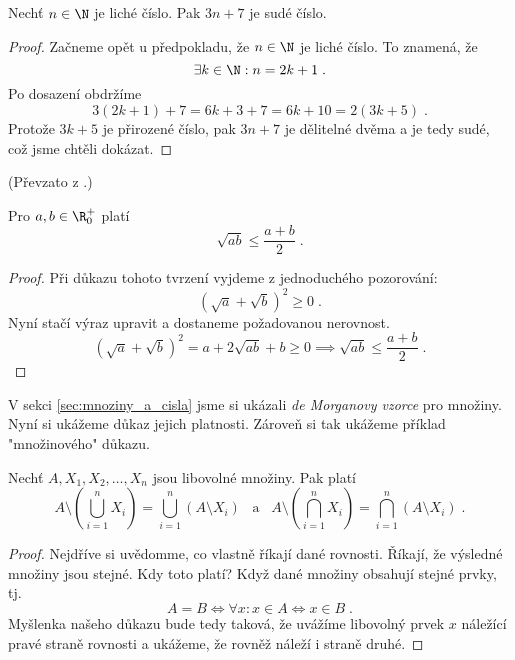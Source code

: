\begin{assertion}
    Nechť $n\in\N$ je liché číslo. Pak $3n+7$ je sudé číslo.
\end{assertion}
\begin{proof}
    Začneme opět u předpokladu, že $n\in\N$ je liché číslo. To znamená, že
    \begin{equation*}
        \exists k\in\N : n=2k+1\; .
    \end{equation*}
    Po dosazení obdržíme
    \begin{equation*}
        3(2k+1)+7=6k+3+7=6k+10=2(3k+5)\; .
    \end{equation*}
    Protože $3k+5$ je přirozené číslo, pak $3n+7$ je dělitelné dvěma a je tedy sudé, což jsme chtěli dokázat.
\end{proof}
(Převzato z \cite{ChartrandPolimeniZhang2014}.)
\begin{assertion}[AG nerovnost]
    Pro $a,b\in\R_0^+$ platí
    \begin{equation*}
        \sqrt{ab}\leq\dfrac{a+b}{2}\; .
    \end{equation*}
\end{assertion}
\begin{proof}
    Při důkazu tohoto tvrzení vyjdeme z jednoduchého pozorování:
    \begin{equation*}
        (\sqrt{a}+\sqrt{b})^2\geq 0\; .
    \end{equation*}
    Nyní stačí výraz upravit a dostaneme požadovanou nerovnost.
    \begin{equation*}
        (\sqrt{a}+\sqrt{b})^2 = a+2\sqrt{ab}+b\geq 0 \implies \sqrt{ab}\leq \dfrac{a+b}{2}\; .
    \end{equation*}
\end{proof}
V sekci \ref{sec:mnoziny_a_cisla} jsme si ukázali \emph{de Morganovy vzorce} pro množiny. Nyní si ukážeme důkaz jejich platnosti. Zároveň si tak ukážeme příklad "množinového" důkazu.
\begin{assertion}
    Nechť $A,X_1,X_2,\ldots,X_n$ jsou libovolné množiny. Pak platí
    \begin{equation*}
        A \setminus \left(\bigcup\limits_{i=1}^{n}{X_i}\right)=\bigcup\limits_{i=1}^{n}{(A \setminus X_i)}\;\;\;\text{a}\;\;\;A \setminus \left(\bigcap\limits_{i=1}^{n}{X_i}\right)=\bigcap\limits_{i=1}^{n}{(A \setminus X_i)}\; .
    \end{equation*}
\end{assertion}
\begin{proof}
    Nejdříve si uvědomme, co vlastně říkají dané rovnosti. Říkají, že výsledné množiny jsou stejné. Kdy toto platí? Když dané množiny obsahují stejné prvky, tj.
    \begin{equation*}
        A=B \iff \forall x : x\in A \iff x\in B\; .     
    \end{equation*}
    Myšlenka našeho důkazu bude tedy taková, že uvážíme libovolný prvek $x$ náležící pravé straně rovnosti a ukážeme, že rovněž náleží i straně druhé.
\end{proof}

